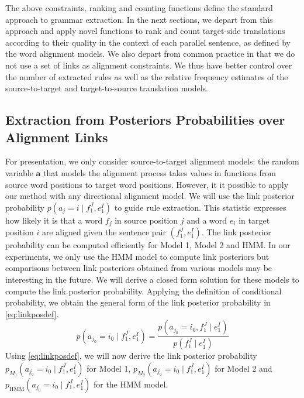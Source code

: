 %
The above constraints, ranking and counting functions define the standard
approach to grammar extraction.
In the next sections, we depart from this approach and apply novel functions
to rank and count target-side translations according to their quality in the
context of each parallel sentence, as defined by the word alignment models. We
also depart from common practice in that we do not use a set of links as
alignment constraints. We thus have better control over the number of extracted
rules as well as the relative frequency estimates of the source-to-target and
target-to-source translation models.

\subsection[Extraction from Posteriors Probabilities over Alignment Links]{Extraction from Posteriors Probabilities over \\ Alignment Links}
\label{sec:extractionFromPosteriorsLink}

For presentation, we only consider source-to-target
alignment models: the random variable $\bm{a}$ that models the alignment
process
takes values in functions from source
word positions to target word positions. However, it it possible to apply
our method with any directional alignment model.
We will use the link
posterior probability $p(a_j = i \mid f_1^J, e_1^I)$ to guide
rule extraction. This statistic expresses how likely it is that
a word $f_j$ in source position $j$ and a word $e_i$ in
target position $i$ are aligned given the sentence pair $(f_1^J,e_1^I)$.
The link posterior probability can be computed efficiently for
Model 1, Model 2 and HMM. In our experiments, we only use the HMM model
to compute link posteriors but comparisons between link posteriors obtained
from various models may be interesting in the future. We will derive
a closed form solution for these models to compute the link posterior
probability.
Applying the definition of conditional
probability, we obtain the general form of the link posterior probability in
\autoref{eq:linkposdef}.
%
\begin{equation} \label{eq:linkposdef}
  p(a_{j_0} = i_0 \mid f_1^J, e_1^I) = \frac{p(a_{j_0}=i_0,f_1^J \mid e_1^I)}{p(f_1^J \mid e_1^I)}
\end{equation}
%
Using \autoref{eq:linkposdef}, we will now derive the link posterior probability
$p_{M_1}(a_{j_0} = i_0 \mid f_1^J, e_1^I)$ for Model 1,
$p_{M_2}(a_{j_0} = i_0 \mid f_1^J, e_1^I)$ for Model 2 and
$p_{\text{HMM}}(a_{j_0} = i_0 \mid f_1^J, e_1^I)$ for the HMM model.


